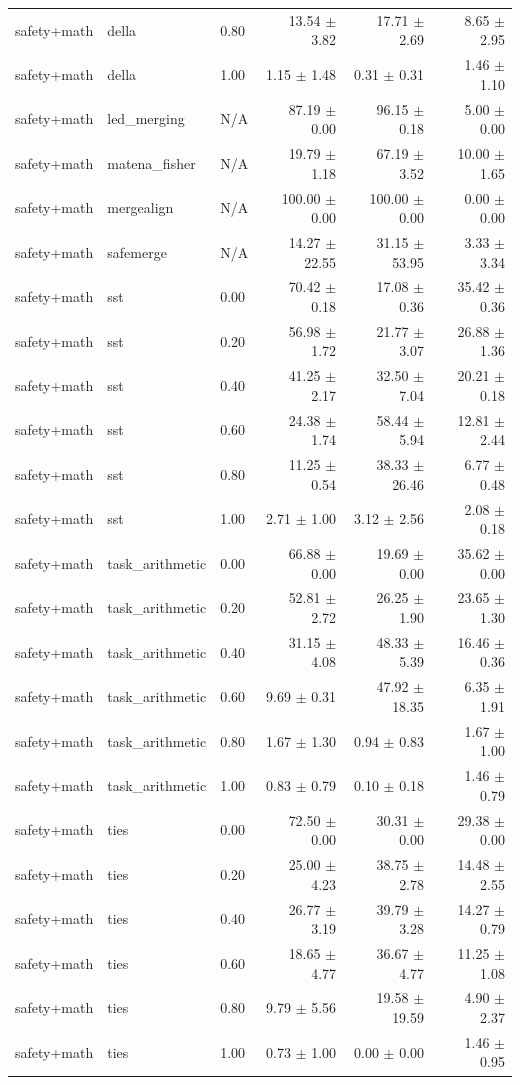 \documentclass{article}
\begin{document}
\begin{table}[H]
{\begin{tabular}{lllrrr}
safety+math & della & 0.80 & 13.54 $\pm$ 3.82 & 17.71 $\pm$ 2.69 & 8.65 $\pm$ 2.95 \\
safety+math & della & 1.00 & 1.15 $\pm$ 1.48 & 0.31 $\pm$ 0.31 & 1.46 $\pm$ 1.10 \\
safety+math & led\_merging & N/A & 87.19 $\pm$ 0.00 & 96.15 $\pm$ 0.18 & 5.00 $\pm$ 0.00 \\
safety+math & matena\_fisher & N/A & 19.79 $\pm$ 1.18 & 67.19 $\pm$ 3.52 & 10.00 $\pm$ 1.65 \\
safety+math & mergealign & N/A & 100.00 $\pm$ 0.00 & 100.00 $\pm$ 0.00 & 0.00 $\pm$ 0.00 \\
safety+math & safemerge & N/A & 14.27 $\pm$ 22.55 & 31.15 $\pm$ 53.95 & 3.33 $\pm$ 3.34 \\
safety+math & sst & 0.00 & 70.42 $\pm$ 0.18 & 17.08 $\pm$ 0.36 & 35.42 $\pm$ 0.36 \\
safety+math & sst & 0.20 & 56.98 $\pm$ 1.72 & 21.77 $\pm$ 3.07 & 26.88 $\pm$ 1.36 \\
safety+math & sst & 0.40 & 41.25 $\pm$ 2.17 & 32.50 $\pm$ 7.04 & 20.21 $\pm$ 0.18 \\
safety+math & sst & 0.60 & 24.38 $\pm$ 1.74 & 58.44 $\pm$ 5.94 & 12.81 $\pm$ 2.44 \\
safety+math & sst & 0.80 & 11.25 $\pm$ 0.54 & 38.33 $\pm$ 26.46 & 6.77 $\pm$ 0.48 \\
safety+math & sst & 1.00 & 2.71 $\pm$ 1.00 & 3.12 $\pm$ 2.56 & 2.08 $\pm$ 0.18 \\
safety+math & task\_arithmetic & 0.00 & 66.88 $\pm$ 0.00 & 19.69 $\pm$ 0.00 & 35.62 $\pm$ 0.00 \\
safety+math & task\_arithmetic & 0.20 & 52.81 $\pm$ 2.72 & 26.25 $\pm$ 1.90 & 23.65 $\pm$ 1.30 \\
safety+math & task\_arithmetic & 0.40 & 31.15 $\pm$ 4.08 & 48.33 $\pm$ 5.39 & 16.46 $\pm$ 0.36 \\
safety+math & task\_arithmetic & 0.60 & 9.69 $\pm$ 0.31 & 47.92 $\pm$ 18.35 & 6.35 $\pm$ 1.91 \\
safety+math & task\_arithmetic & 0.80 & 1.67 $\pm$ 1.30 & 0.94 $\pm$ 0.83 & 1.67 $\pm$ 1.00 \\
safety+math & task\_arithmetic & 1.00 & 0.83 $\pm$ 0.79 & 0.10 $\pm$ 0.18 & 1.46 $\pm$ 0.79 \\
safety+math & ties & 0.00 & 72.50 $\pm$ 0.00 & 30.31 $\pm$ 0.00 & 29.38 $\pm$ 0.00 \\
safety+math & ties & 0.20 & 25.00 $\pm$ 4.23 & 38.75 $\pm$ 2.78 & 14.48 $\pm$ 2.55 \\
safety+math & ties & 0.40 & 26.77 $\pm$ 3.19 & 39.79 $\pm$ 3.28 & 14.27 $\pm$ 0.79 \\
safety+math & ties & 0.60 & 18.65 $\pm$ 4.77 & 36.67 $\pm$ 4.77 & 11.25 $\pm$ 1.08 \\
safety+math & ties & 0.80 & 9.79 $\pm$ 5.56 & 19.58 $\pm$ 19.59 & 4.90 $\pm$ 2.37 \\
safety+math & ties & 1.00 & 0.73 $\pm$ 1.00 & 0.00 $\pm$ 0.00 & 1.46 $\pm$ 0.95 \\
\bottomrule
\end{tabular}
}
\end{table}
\end{document}
